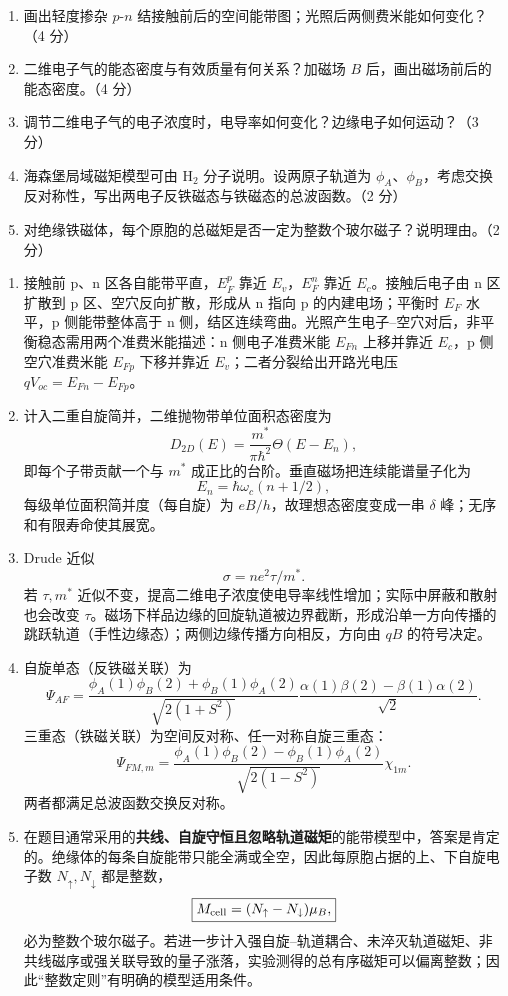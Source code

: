 \begin{question}[15 分]
\begin{enumerate}
  \item 画出轻度掺杂 $p$-$n$ 结接触前后的空间能带图；光照后两侧费米能如何变化？（4 分）
  \item 二维电子气的能态密度与有效质量有何关系？加磁场 $B$ 后，画出磁场前后的能态密度。（4 分）
  \item 调节二维电子气的电子浓度时，电导率如何变化？边缘电子如何运动？（3 分）
  \item 海森堡局域磁矩模型可由 $\mathrm H_2$ 分子说明。设两原子轨道为 $\phi_A$、$\phi_B$，考虑交换反对称性，写出两电子反铁磁态与铁磁态的总波函数。（2 分）
  \item 对绝缘铁磁体，每个原胞的总磁矩是否一定为整数个玻尔磁子？说明理由。（2 分）
\end{enumerate}


\begin{solution}
\begin{enumerate}
  \item 接触前 p、n 区各自能带平直，$E_F^p$ 靠近 $E_v$，$E_F^n$ 靠近 $E_c$。接触后电子由 n 区扩散到 p 区、空穴反向扩散，形成从 n 指向 p 的内建电场；平衡时 $E_F$ 水平，p 侧能带整体高于 n 侧，结区连续弯曲。光照产生电子--空穴对后，非平衡稳态需用两个准费米能描述：n 侧电子准费米能 $E_{Fn}$ 上移并靠近 $E_c$，p 侧空穴准费米能 $E_{Fp}$ 下移并靠近 $E_v$；二者分裂给出开路光电压
  $qV_{oc}=E_{Fn}-E_{Fp}$。
  \item 计入二重自旋简并，二维抛物带单位面积态密度为
  \[
    \boxed{D_{2D}(E)=\frac{m^*}{\pi\hbar^2}\Theta(E-E_n),}
  \]
  即每个子带贡献一个与 $m^*$ 成正比的台阶。垂直磁场把连续能谱量子化为
  \[
    E_n=\hbar\omega_c(n+1/2),
  \]
  每级单位面积简并度（每自旋）为 $eB/h$，故理想态密度变成一串 $\delta$ 峰；无序和有限寿命使其展宽。
  \item Drude 近似
  \[
    \sigma=ne^2\tau/m^*.
  \]
  若 $\tau,m^*$ 近似不变，提高二维电子浓度使电导率线性增加；实际中屏蔽和散射也会改变 $\tau$。磁场下样品边缘的回旋轨道被边界截断，形成沿单一方向传播的跳跃轨道（手性边缘态）；两侧边缘传播方向相反，方向由 $qB$ 的符号决定。
  \item 自旋单态（反铁磁关联）为
  \[
   \Psi_{AF}=\frac{\phi_A(1)\phi_B(2)+\phi_B(1)\phi_A(2)}
   {\sqrt{2(1+S^2)}}
   \frac{\alpha(1)\beta(2)-\beta(1)\alpha(2)}{\sqrt2}.
  \]
  三重态（铁磁关联）为空间反对称、任一对称自旋三重态：
  \[
   \Psi_{FM,m}=\frac{\phi_A(1)\phi_B(2)-\phi_B(1)\phi_A(2)}
   {\sqrt{2(1-S^2)}}\chi_{1m}.
  \]
  两者都满足总波函数交换反对称。
  \item 在题目通常采用的\textbf{共线、自旋守恒且忽略轨道磁矩}的能带模型中，答案是肯定的。绝缘体的每条自旋能带只能全满或全空，因此每原胞占据的上、下自旋电子数 $N_\uparrow,N_\downarrow$ 都是整数，
  \[
    \boxed{M_{\rm cell}=(N_\uparrow-N_\downarrow)\mu_B,}
  \]
  必为整数个玻尔磁子。若进一步计入强自旋--轨道耦合、未淬灭轨道磁矩、非共线磁序或强关联导致的量子涨落，实验测得的总有序磁矩可以偏离整数；因此“整数定则”有明确的模型适用条件。
\end{enumerate}
\end{solution}
\end{question}
